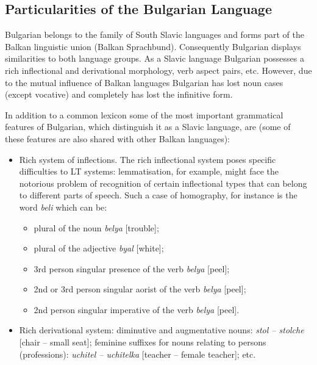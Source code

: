 \begin{multicols}{2}
  \subsection{Particularities of the Bulgarian Language}

  Bulgarian belongs to the family of South Slavic languages and forms part of the Balkan linguistic union (Balkan Sprachbund). Consequently Bulgarian displays similarities to both language groups. As a Slavic language Bulgarian possesses a rich inflectional and derivational morphology, verb aspect pairs, etc. However, due to the mutual influence of Balkan languages Bulgarian has lost noun cases (except vocative) and completely has lost the infinitive form.


  In addition to a common lexicon some of the most important grammatical features of Bulgarian, which distinguish it as a Slavic language, are (some of these features are also shared with other Balkan languages):

  \begin{itemize}
  \item Rich system of inflections. The rich inflectional system poses specific difficulties to LT systems: lemmatisation, for example, might face the notorious problem of recognition of certain inflectional types that can belong to different parts of speech. Such a case of homography, for instance is the word \textit{{beli}} which can be: 

  \begin{itemize}
  \item plural of the noun \textit{{belya}} [trouble];
  \item plural of the adjective \textit{{byal}} [white];
  \item 3rd person singular presence of the verb \textit{{belya}} [peel];
  \item 2nd or 3rd person singular aorist of the verb \textit{{belya}} [peel];
  \item 2nd person singular imperative of the verb \textit{{belya}} [peel]. 
  \end{itemize}

  \item Rich derivational system: diminutive and augmentative nouns: \textit{{stol -- stolche}} [chair -- small seat]; feminine suffixes for nouns relating to persons (professions): \textit{{uchitel -- uchitelka}} [teacher -- female teacher]; etc.


\end{itemize}
\end{multicols}
